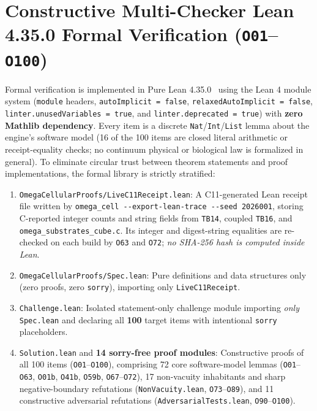 \documentclass[11pt,reqno]{amsart}
\begin{document}
\section{Constructive Multi-Checker Lean 4.35.0 Formal Verification (\texorpdfstring{\texttt{O01}--\texttt{O100}}{O01-O100})}
\label{sec:lean}

Formal verification is implemented in Pure Lean 4.35.0~\cite{demoura2021lean4} using the Lean 4 module system (\texttt{module} headers, \nolinkurl{autoImplicit = false}, \nolinkurl{relaxedAutoImplicit = false}, \nolinkurl{linter.unusedVariables = true}, and \nolinkurl{linter.deprecated = true}) with \textbf{zero Mathlib dependency}. Every item is a discrete \texttt{Nat}/\texttt{Int}/\texttt{List} lemma about the engine's software model (16 of the 100 items are closed literal arithmetic or receipt-equality checks; no continuum physical or biological law is formalized in general). To eliminate circular trust between theorem statements and proof implementations, the formal library is strictly stratified:
\begin{enumerate}
  \item \nolinkurl{OmegaCellularProofs/LiveC11Receipt.lean}: A C11-generated Lean receipt file written by \nolinkurl{omega_cell --export-lean-trace --seed 2026001}, storing C-reported integer counts and string fields from \texttt{TB14}, coupled \texttt{TB16}, and \nolinkurl{omega_substrates_cube.c}. Its integer and digest-string equalities are re-checked on each build by \texttt{O63} and \texttt{O72}; \emph{no SHA-256 hash is computed inside Lean}.
  \item \nolinkurl{OmegaCellularProofs/Spec.lean}: Pure definitions and data structures only (zero proofs, zero \texttt{sorry}), importing only \texttt{LiveC11Receipt}.
  \item \texttt{Challenge.lean}: Isolated statement-only challenge module importing \emph{only} \texttt{Spec.lean} and declaring all \textbf{100} target items with intentional \texttt{sorry} placeholders.
  \item \texttt{Solution.lean} and \textbf{14 sorry-free proof modules}: Constructive proofs of all 100 items (\texttt{O01}--\texttt{O100}), comprising 72 core software-model lemmas (\texttt{O01}--\texttt{O63}, \texttt{O01b}, \texttt{O41b}, \texttt{O59b}, \texttt{O67}--\texttt{O72}), 17 non-vacuity inhabitants and sharp negative-boundary refutations (\texttt{NonVacuity.lean}, \texttt{O73}--\texttt{O89}), and 11 constructive adversarial refutations (\texttt{AdversarialTests.lean}, \texttt{O90}--\texttt{O100}).
\end{enumerate}
\end{document}
